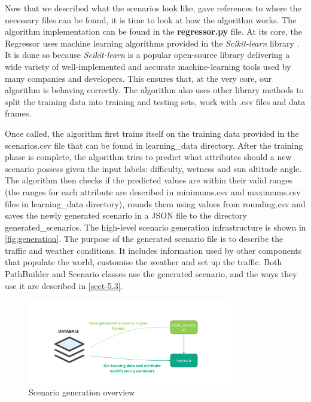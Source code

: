Now that we described what the scenarios look like, gave references to where the necessary files can be found, it is time to look at how the algorithm works. The algorithm implementation can be found in the \textbf{regressor.py} file. At its core, the Regressor uses machine learning algorithms provided in the \textit{Scikit-learn} library \cite{pedregosa2011scikit}. It is done so because \textit{Scikit-learn} is a popular open-source library delivering a wide variety of well-implemented and accurate machine-learning tools used by many companies and developers. This ensures that, at the very core, our algorithm is behaving correctly. The algorithm also uses other library methods to split the training data into training and testing sets, work with .csv files and data frames.

Once called, the algorithm first trains itself on the training data provided in the scenarios.csv file that can be found in learning\_data directory. After the training phase is complete, the algorithm tries to predict what attributes should a  new scenario possess given the input labels: difficulty, wetness and sun altitude angle. The algorithm then checks if the predicted values are within their valid ranges (the ranges for each attribute are described in minimums.csv and maximums.csv files in learning\_data directory), rounds them using values from rounding.csv and saves the newly generated scenario in a JSON file to the directory generated\_scenarios. The high-level scenario generation infrastructure is shown in \autoref{fig:generation}. The purpose of the generated scenario file is to describe the traffic and weather conditions. It includes information used by other components that populate the world, customise the weather and set up the traffic. Both PathBuilder and Scenario classes use the generated scenario, and the ways they use it are described in \autoref{sect-5.3}.

\begin{figure}
    \centering
    \includegraphics[width = 0.8\textwidth]{research_paper/Images/scenario_generation.png}
    \caption{Scenario generation overview}
    \label{fig:generation}
\end{figure}


